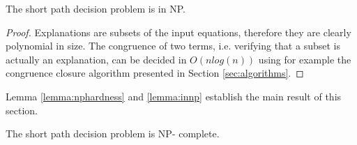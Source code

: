 \begin{lemma}[In NP]
\label{lemma:innp}
The short path decision problem is in NP.

\end{lemma}
\begin{proof}

Explanations are subsets of the input equations, therefore they are clearly polynomial in size.
The congruence of two terms, i.e. verifying that a subset is actually an explanation, can be decided in $O(n log(n))$ using for example the congruence closure algorithm presented in Section \ref{sec:algorithms}.

\end{proof}

Lemma \ref{lemma:nphardness} and \ref{lemma:innp} establish the main result of this section.

\begin{theorem}[NP - completeness]

The short path decision problem is NP- complete.

\end{theorem}